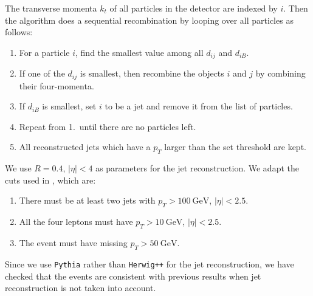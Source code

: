 \documentclass[twoside,english]{uiofysmaster}
\begin{document}
The transverse momenta $k_t$ of all particles in the detector are indexed by $i$. Then the algorithm does a sequential recombination by looping over all particles as follows:
\begin{enumerate}
  \item For a particle $i$, find the smallest value among all $d_{ij}$ and $d_{iB}$.
  \item If one of the $d_{ij}$ is smallest, then recombine the objects $i$ and $j$ by combining their four-momenta.
  \item If $d_{iB}$ is smallest, set $i$ to be a jet and remove it from the list of particles.
  \item Repeat from 1.\ until there are no particles left.
  \item All reconstructed jets which have a $p_T$ larger than the set threshold are kept.
\end{enumerate}

We use $R = 0.4$, $|\eta|<4$ as parameters for the jet reconstruction. We adapt the cuts used in \cite{Cheng:2009fw}, which are:
\begin{enumerate}
	\item There must be at least two jets with $p_T > 100~\mathrm{GeV}$, $|\eta|<2.5$.
	\item All the four leptons must have $p_T > 10~\mathrm{GeV}$, $|\eta|<2.5$.
	\item The event must have missing $p_T > 50~\mathrm{GeV}$.
\end{enumerate}
Since we use {\tt Pythia} rather than {\tt Herwig++} for the jet reconstruction, we have checked that the events are consistent with previous results when jet reconstruction is not taken into account. 
\end{document}
